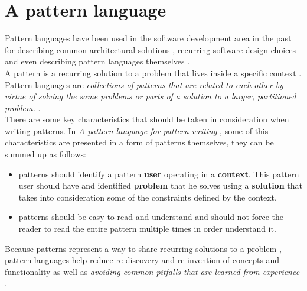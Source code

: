     \section{A pattern language} \label{sec:stateoftheart:sec:patterns}
    Pattern languages have been used in the software development area in the past for describing common architectural solutions \cite{kircher2013pattern}, recurring software design choices \cite{johnson1995design} and even describing pattern languages themselves \cite{Meszaros1998}.\\
    A pattern is a recurring solution to a problem that lives inside a specific context \cite{Meszaros1998}. Pattern languages are \textit{collections of patterns that are related to each other by virtue of solving the same problems or parts of a solution to a larger, partitioned problem.} \cite{Meszaros1998}.\\
    There are some key characteristics that should be taken in consideration when writing patterns. In \textit{A pattern language for pattern writing} \cite{Meszaros1998}, some of this characteristics are presented in a form of patterns themselves, they can be summed up as follows:
    \begin{itemize}
      \item patterns should identify a pattern \textbf{user} operating in a \textbf{context}. This pattern user should have and identified \textbf{problem} that he solves using a \textbf{solution} that takes into consideration some of the constraints defined by the context.
      \item patterns should be easy to read and understand and should not force the reader to read the entire pattern multiple times in order understand it.
    \end{itemize}
    Because patterns represent a way to share recurring solutions to a problem \cite{Meszaros1998}, pattern languages help reduce re-discovery and re-invention of concepts and functionality as well as \textit{avoiding common pitfalls that are learned from experience} \cite{Schmidt1995}.

